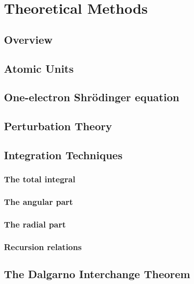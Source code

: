 \chapter{Theoretical Methods}
    \section{Overview}
    \section{Atomic Units}
    \section{One-electron Shrödinger equation}
    \section{Perturbation Theory}
    \section{Integration Techniques}
        \subsection{The total integral}
        \subsection{The angular part}
        \subsection{The radial part}
        \subsection{Recursion relations}
    \section{The Dalgarno Interchange Theorem}
    
    